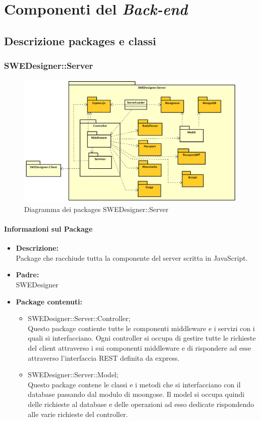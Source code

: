 \section{Componenti del \emph{Back-end}}
	\subsection{Descrizione packages e classi}
		\subsubsection{SWEDesigner::Server}
		 \begin{figure}[h!]
		\centering
		\includegraphics[scale=0.4]{Disegnetti/Back-End.png}
		\caption{Diagramma dei packages SWEDesigner::Server}
 		\end{figure}
		\paragraph{Informazioni sul Package}
		\begin{itemize}
			\item \textbf{Descrizione: }\\
			Package che racchiude tutta la componente del server scritta in JavaScript.
			\item \textbf{Padre: }\\ SWEDesigner
			\item \textbf{Package contenuti: }
			\begin{itemize}
				\item SWEDesigner::Server::Controller;\\
				Questo package contiente tutte le componenti middleware e i servizi con i quali si interfacciano.
				Ogni controller si occupa di gestire tutte le richieste del client attraverso i sui componenti middleware e di rispondere ad esse attraverso
				l'interfaccia REST definita da express.
				\item SWEDesigner::Server::Model;\\
				Questo package contene le classi e i metodi che si interfacciano con il database passando dal modulo di moongose.
				Il model si occupa quindi delle richieste al database e delle operazioni ad esso dedicate rispondendo alle varie richieste del controller.
			\end{itemize}
		\end{itemize}

